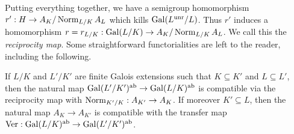 Putting everything together, we have a semigroup homomorphism $r': H
\to A_K/\operatorname{Norm}_{L/K}A_L$ which kills $\operatorname{Gal}(L^{\operatorname{unr}}/L)$.
Thus $r'$ induces a homomorphism $r = r_{L/K}: \operatorname{Gal}(L/K) \to
A_K/\operatorname{Norm}_{L/K}A_L$. We call this the \emph{reciprocity map}.
Some straightforward functorialities are left to the reader, including the following.
\begin{prop} \label{P:abstract functorialities}
  If $L/K$ and $L'/K'$ are finite Galois extensions such that
$K \subseteq K'$ and $L \subseteq L'$, then the natural map
$\operatorname{Gal}(L'/K')^{\operatorname{ab}} \to \operatorname{Gal}(L/K)^{\operatorname{ab}}$ is compatible via the reciprocity
map with $\operatorname{Norm}_{K'/K}: A_{K'} \to A_K$. If moreover $K' \subseteq L$,
then the natural map $A_K \to A_{K'}$ is compatible with the transfer
map $\operatorname{Ver}: \operatorname{Gal}(L/K)^{\operatorname{ab}} \to \operatorname{Gal}(L'/K')^{\operatorname{ab}}$.
\end{prop}


